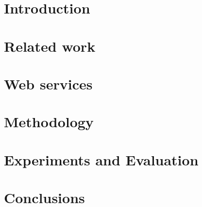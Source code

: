 
\section{Introduction}
\label{sec:introduction}


\section{Related work}
\label{sec:related_work}


\section{Web services}
\label{sec:webservices}


\section{Methodology}
\label{sec:methodology}


\section{Experiments and Evaluation}
\label{sec:experiments}


\section{Conclusions}
\label{sec:conclusions}
